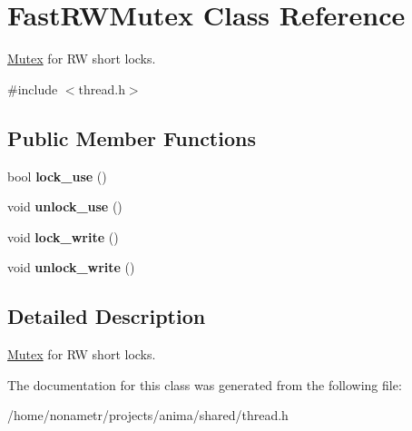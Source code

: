 \hypertarget{classFastRWMutex}{
\section{FastRWMutex Class Reference}
\label{classFastRWMutex}
}


\hyperlink{classMutex}{Mutex} for RW short locks.  




{\ttfamily \#include $<$thread.h$>$}

\subsection*{Public Member Functions}
\begin{DoxyCompactItemize}
\item 
\hypertarget{classFastRWMutex_ab91b5738559b63f029db52be1f5bf41d}{
bool {\bfseries lock\_\-use} ()}
\label{classFastRWMutex_ab91b5738559b63f029db52be1f5bf41d}

\item 
\hypertarget{classFastRWMutex_ab7a03a1285ab2be407b7946425a50b4f}{
void {\bfseries unlock\_\-use} ()}
\label{classFastRWMutex_ab7a03a1285ab2be407b7946425a50b4f}

\item 
\hypertarget{classFastRWMutex_a6c5a991a310c5c04249a1c64cab0b89e}{
void {\bfseries lock\_\-write} ()}
\label{classFastRWMutex_a6c5a991a310c5c04249a1c64cab0b89e}

\item 
\hypertarget{classFastRWMutex_a34fa54965c5af6e398468d20ed97aa2e}{
void {\bfseries unlock\_\-write} ()}
\label{classFastRWMutex_a34fa54965c5af6e398468d20ed97aa2e}

\end{DoxyCompactItemize}


\subsection{Detailed Description}
\hyperlink{classMutex}{Mutex} for RW short locks. 

The documentation for this class was generated from the following file:\begin{DoxyCompactItemize}
\item 
/home/nonametr/projects/anima/shared/thread.h\end{DoxyCompactItemize}
